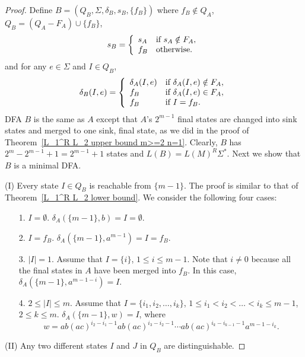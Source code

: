 \documentclass[10pt]{article}
\begin{document}
\begin{proof}
Define $B=(Q_B,\Sigma , \delta_B , s_B, \{f_B\})$ where $f_B\notin
Q_A$, $Q_B=(Q_A-F_A)\cup \{f_B\}$,
\begin{eqnarray*}
s_B = \left\{
\begin{array}{l l}
  s_A & \mbox{if }s_A\notin F_A,\\
  f_B & \mbox{otherwise.}\\
\end{array} \right.
\end{eqnarray*}
and for any $e\in \Sigma$ and $I\in Q_B$,
\begin{eqnarray*}
\delta_B(I, e) = \left\{
\begin{array}{l l}
  \delta_A(I, e) & \mbox{if }\delta_A(I, e)\notin F_A,\\
  f_B & \mbox{if }\delta_A(I, e)\in F_A,\\
  f_B & \mbox{if }I=f_B.\\
\end{array} \right.
\end{eqnarray*}
DFA $B$ is the same as $A$ except that $A$'s $2^{m-1}$ final states
are changed into sink states and merged to one sink, final state, as
we did in the proof of Theorem~\ref{L_1^R L_2 upper bound m>=2 n=1}.
Clearly, $B$ has $2^m-2^{m-1}+1=2^{m-1}+1$ states and
$L(B)=L(M)^R\Sigma^*$. Next we show that $B$ is a minimal DFA.

(I) Every state $I\in Q_B$ is reachable from $\{m-1\}$. The proof is
similar to that of  Theorem~\ref{L_1^R L_2 lower bound}. We consider
the following four cases:

\begin{itemize}
\item[{\rm 1.}]$I=\emptyset$.
$\delta_A(\{ m-1 \}, b) = I=\emptyset .$
\item[{\rm 2.}]$I=f_B$. $\delta_A(\{ m-1 \}, a^{m-1}) =I=f_B.$
\item[{\rm 3.}]$|I|=1$.
Assume that $I=\{ i \}$, $1\leq i\leq m-1$. Note that $i\neq 0$
because all the final states in $A$ have been merged into $f_B$. In
this case, $\delta_A(\{ m-1 \}, a^{m-1-i}) =I.$
\item[{\rm 4.}]$2\leq |I|\leq m$.
Assume that $I=\{ i_1, i_2, \ldots ,i_k \}$, $1\leq i_1<i_2< \ldots
<i_k \leq m-1$, $2\leq k\leq m$. $\delta_A(\{ m-1 \}, w) = I$, where
$$w = ab(ac)^{i_2-i_1-1}ab(ac)^{i_{3}-i_{2}-1}\cdots ab(ac)^{i_k-i_{k-1}-1}a^{m-1-i_k}.$$
\end{itemize}

(II) Any two different states $I$ and $J$ in $Q_B$ are
distinguishable.


\end{proof}
\end{document}
